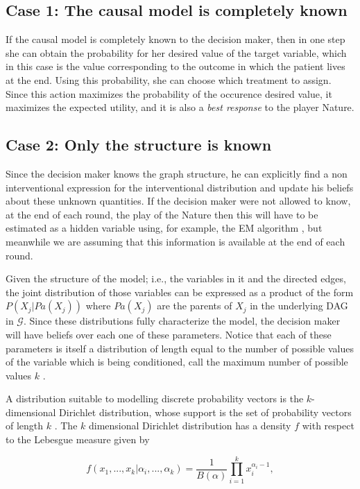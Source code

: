 \documentclass[english,letterpaper,12pt,final]{article}
\theoremstyle{definition}
\begin{document}
\subsection{Case 1: The causal model is completely known}
If the causal model is completely known to the decision maker, then in one step she can obtain the probability for her desired value of the target variable, which in this case is the value corresponding to the outcome in which the patient lives at the end. Using this probability, she can choose which treatment to assign. Since this action maximizes the probability of the occurence desired value, it maximizes the expected utility, and it is also a \textit{best response} to the player Nature.

\subsection{Case 2: Only the structure is known}
Since the decision maker knows the graph structure, he can explicitly find a non interventional expression for the interventional distribution and update his beliefs about these unknown quantities. If the decision maker were not allowed to know, at the end of each round, the play of the Nature then this will have to be estimated as a hidden variable using, for example, the EM algorithm \cite{dempster1977maximum}, but meanwhile we are assuming that this information is available at the end of each round.

Given the structure of the model; i.e., the variables in it and the directed edges, the joint distribution of those variables can be expressed as a product of the form $P(X_j | Pa(X_j))$ where $Pa(X_j)$ are the parents of $X_j$ in the underlying DAG in $\mathcal{G}$. Since these distributions fully characterize the model, the decision maker will have beliefs over each one of these parameters. Notice that each of these parameters is itself a distribution of length equal to the number of possible values of the variable which is being conditioned, call the maximum number of possible values $k$ . 

A distribution suitable to modelling discrete probability vectors is the $k$-dimensional Dirichlet distribution, whose support is the set of probability vectors of length $k$ \cite{hjort2010bayesian}. The $k$ dimensional Dirichlet distribution has a density $f$ with respect to the Lebesgue measure given by

\[ f(x_1,...,x_k | \alpha_i,...,\alpha_k)=\frac{1}{B(\alpha)}  \prod_{i=1}^k x_i^{\alpha_i-1},\]
\end{document}
